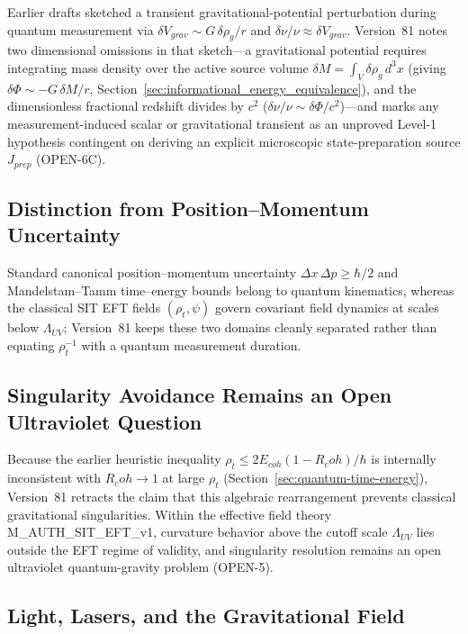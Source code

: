 \documentclass[american,11pt,letterpaper]{article}
\newcommand{\Rcoh}{R_{\mathrm{coh}}}
\def\mathrm#1{#1}%
\def\texttt#1{#1}%
\def\Rcoh{R_coh}%
\begin{document}
Earlier drafts sketched a transient gravitational-potential perturbation during quantum measurement via $\delta V_{\mathrm{grav}} \sim G\,\delta\rho_g/r$ and $\delta\nu/\nu \approx \delta V_{\mathrm{grav}}$. Version~81 notes two dimensional omissions in that sketch---a gravitational potential requires integrating mass density over the active source volume $\delta M = \int_V \delta\rho_g\,d^3x$ (giving $\delta\Phi \sim -G\,\delta M/r$, Section~\ref{sec:informational_energy_equivalence}), and the dimensionless fractional redshift divides by $c^2$ ($\delta\nu/\nu \sim \delta\Phi/c^2$)---and marks any measurement-induced scalar or gravitational transient as an unproved Level-1 hypothesis contingent on deriving an explicit microscopic state-preparation source $J_{\mathrm{prep}}$ (\texttt{OPEN-6C}).

\subsection{Distinction from Position--Momentum Uncertainty}
\label{sec:uncertainty-distinction}

Standard canonical position--momentum uncertainty $\Delta x\,\Delta p \ge \hbar/2$ and Mandelstam--Tamm time--energy bounds belong to quantum kinematics, whereas the classical SIT EFT fields $(\rho_t, \psi)$ govern covariant field dynamics at scales below $\Lambda_{\mathrm{UV}}$; Version~81 keeps these two domains cleanly separated rather than equating $\rho_t^{-1}$ with a quantum measurement duration.

\subsection{Singularity Avoidance Remains an Open Ultraviolet Question}
\label{sec:collapse-prevention}

Because the earlier heuristic inequality $\rho_t \le 2E_{\mathrm{coh}}(1 - \Rcoh)/\hbar$ is internally inconsistent with $\Rcoh \to 1$ at large $\rho_t$ (Section~\ref{sec:quantum-time-energy}), Version~81 retracts the claim that this algebraic rearrangement prevents classical gravitational singularities. Within the effective field theory \texttt{M\_AUTH\_SIT\_EFT\_v1}, curvature behavior above the cutoff scale $\Lambda_{\mathrm{UV}}$ lies outside the EFT regime of validity, and singularity resolution remains an open ultraviolet quantum-gravity problem (\texttt{OPEN-5}).

\subsection{Light, Lasers, and the Gravitational Field}
\end{document}
